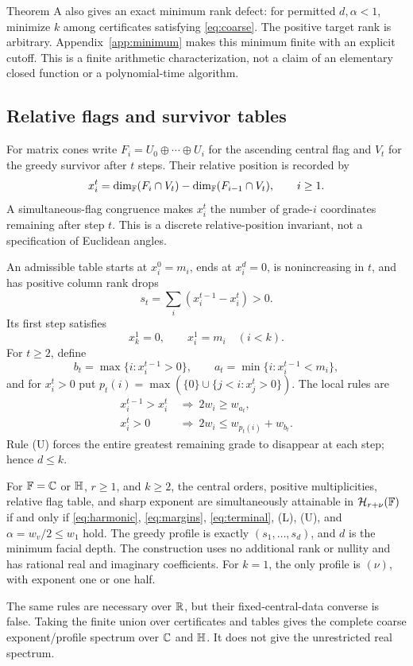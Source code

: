 Theorem A also gives an exact minimum rank defect: for permitted $d,\alpha<1$, minimize $k$ among certificates satisfying \eqref{eq:coarse}. The positive target rank is arbitrary. Appendix~\ref{app:minimum} makes this minimum finite with an explicit cutoff. This is a finite arithmetic characterization, not a claim of an elementary closed function or a polynomial-time algorithm.

\subsection{Relative flags and survivor tables}
For matrix cones write $F_i=U_0\oplus\cdots\oplus U_i$ for the ascending central flag and $V_t$ for the greedy survivor after $t$ steps. Their relative position is recorded by
\[
 x_i^t=\dim_{\mathbb F}(F_i\cap V_t)-\dim_{\mathbb F}(F_{i-1}\cap V_t),\qquad i\ge1.
\]
A simultaneous-flag congruence makes $x_i^t$ the number of grade-$i$ coordinates remaining after step $t$. This is a discrete relative-position invariant, not a specification of Euclidean angles.

An admissible table starts at $x_i^0=m_i$, ends at $x_i^d=0$, is nonincreasing in $t$, and has positive column rank drops
\begin{equation}\label{eq:margins}
 s_t=\sum_i(x_i^{t-1}-x_i^t)>0.
\end{equation}
Its first step satisfies
\begin{equation}\label{eq:terminal}
 x_k^1=0,\qquad x_i^1=m_i\quad(i<k).
\end{equation}
For $t\ge2$, define
\[
 b_t=\max\{i:x_i^{t-1}>0\},\qquad
 a_t=\min\{i:x_i^{t-1}<m_i\},
\]
and for $x_i^t>0$ put $p_t(i)=\max(\{0\}\cup\{j<i:x_j^t>0\})$. The local rules are
\begin{align}
 x_i^{t-1}>x_i^t&\ \Longrightarrow\ 2w_i\ge w_{a_t},\tag{L}\label{eq:L}\\
 x_i^t>0&\ \Longrightarrow\ 2w_i\le w_{p_t(i)}+w_{b_t}.\tag{U}\label{eq:U}
\end{align}
Rule (U) forces the entire greatest remaining grade to disappear at each step; hence $d\le k$.

\begin{theoremB}\label{thm:B}
For $\mathbb F=\mathbb C$ or $\mathbb H$, $r\ge1$, and $k\ge2$, the central orders, positive multiplicities, relative flag table, and sharp exponent are simultaneously attainable in $\mathcal H_{r+\nu}(\mathbb F)$ if and only if \eqref{eq:harmonic}, \eqref{eq:margins}, \eqref{eq:terminal}, (L), (U), and $\alpha=w_v/2\le w_1$ hold. The greedy profile is exactly $(s_1,\ldots,s_d)$, and $d$ is the minimum facial depth. The construction uses no additional rank or nullity and has rational real and imaginary coefficients. For $k=1$, the only profile is $(\nu)$, with exponent one or one half.
\end{theoremB}
The same rules are necessary over $\mathbb R$, but their fixed-central-data converse is false. Taking the finite union over certificates and tables gives the complete coarse exponent/profile spectrum over $\mathbb C$ and $\mathbb H$. It does not give the unrestricted real spectrum.

